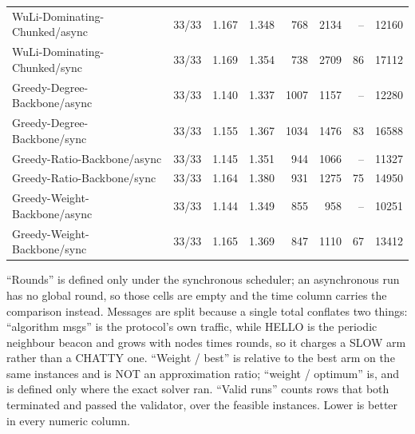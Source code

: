 \begin{table}[tb]
\begin{tabular}{lrrrrrrr}
WuLi-Dominating-Chunked/async & 33/33 & 1.167 & 1.348 & 768 & 2134 & -- & 12160 \\
WuLi-Dominating-Chunked/sync & 33/33 & 1.169 & 1.354 & 738 & 2709 & 86 & 17112 \\
Greedy-Degree-Backbone/async & 33/33 & 1.140 & 1.337 & 1007 & 1157 & -- & 12280 \\
Greedy-Degree-Backbone/sync & 33/33 & 1.155 & 1.367 & 1034 & 1476 & 83 & 16588 \\
Greedy-Ratio-Backbone/async & 33/33 & 1.145 & 1.351 & 944 & 1066 & -- & 11327 \\
Greedy-Ratio-Backbone/sync & 33/33 & 1.164 & 1.380 & 931 & 1275 & 75 & 14950 \\
Greedy-Weight-Backbone/async & 33/33 & 1.144 & 1.349 & 855 & 958 & -- & 10251 \\
Greedy-Weight-Backbone/sync & 33/33 & 1.165 & 1.369 & 847 & 1110 & 67 & 13412 \\
\bottomrule
\end{tabular}
\begin{flushleft}\footnotesize
``Rounds'' is defined only under the synchronous scheduler; an asynchronous run has no global round, so those cells are empty and the time column carries the comparison instead. Messages are split because a single total conflates two things: ``algorithm msgs'' is the protocol's own traffic, while HELLO is the periodic neighbour beacon and grows with nodes times rounds, so it charges a SLOW arm rather than a CHATTY one. ``Weight / best'' is relative to the best arm on the same instances and is NOT an approximation ratio; ``weight / optimum'' is, and is defined only where the exact solver ran. ``Valid runs'' counts rows that both terminated and passed the validator, over the feasible instances. Lower is better in every numeric column.
\end{flushleft}
\end{table}
